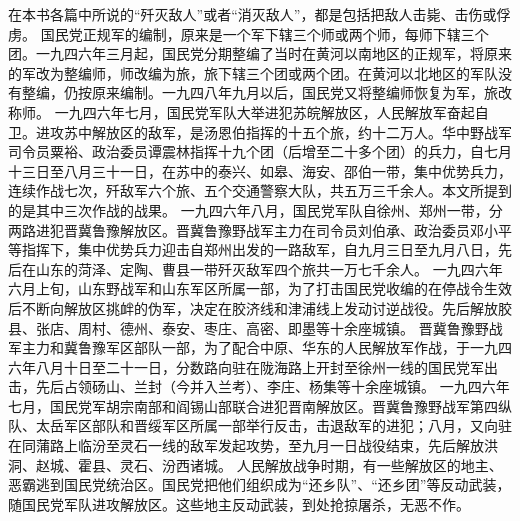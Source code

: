 \begin{maonote}
在本书各篇中所说的“歼灭敌人”或者“消灭敌人”，都是包括把敌人击毙、击伤或俘虏。
国民党正规军的编制，原来是一个军下辖三个师或两个师，每师下辖三个团。一九四六年三月起，国民党分期整编了当时在黄河以南地区的正规军，将原来的军改为整编师，师改编为旅，旅下辖三个团或两个团。在黄河以北地区的军队没有整编，仍按原来编制。一九四八年九月以后，国民党又将整编师恢复为军，旅改称师。
一九四六年七月，国民党军队大举进犯苏皖解放区，人民解放军奋起自卫。进攻苏中解放区的敌军，是汤恩伯指挥的十五个旅，约十二万人。华中野战军司令员粟裕、政治委员谭震林指挥十九个团（后增至二十多个团）的兵力，自七月十三日至八月三十一日，在苏中的泰兴、如皋、海安、邵伯一带，集中优势兵力，连续作战七次，歼敌军六个旅、五个交通警察大队，共五万三千余人。本文所提到的是其中三次作战的战果。
一九四六年八月，国民党军队自徐州、郑州一带，分两路进犯晋冀鲁豫解放区。晋冀鲁豫野战军主力在司令员刘伯承、政治委员邓小平等指挥下，集中优势兵力迎击自郑州出发的一路敌军，自九月三日至九月八日，先后在山东的菏泽、定陶、曹县一带歼灭敌军四个旅共一万七千余人。
一九四六年六月上旬，山东野战军和山东军区所属一部，为了打击国民党收编的在停战令生效后不断向解放区挑衅的伪军，决定在胶济线和津浦线上发动讨逆战役。先后解放胶县、张店、周村、德州、泰安、枣庄、高密、即墨等十余座城镇。
晋冀鲁豫野战军主力和冀鲁豫军区部队一部，为了配合中原、华东的人民解放军作战，于一九四六年八月十日至二十一日，分数路向驻在陇海路上开封至徐州一线的国民党军出击，先后占领砀山、兰封（今并入兰考）、李庄、杨集等十余座城镇。
一九四六年七月，国民党军胡宗南部和阎锡山部联合进犯晋南解放区。晋冀鲁豫野战军第四纵队、太岳军区部队和晋绥军区所属一部举行反击，击退敌军的进犯；八月，又向驻在同蒲路上临汾至灵石一线的敌军发起攻势，至九月一日战役结束，先后解放洪洞、赵城、霍县、灵石、汾西诸城。
人民解放战争时期，有一些解放区的地主、恶霸逃到国民党统治区。国民党把他们组织成为“还乡队”、“还乡团”等反动武装，随国民党军队进攻解放区。这些地主反动武装，到处抢掠屠杀，无恶不作。
\end{maonote}
